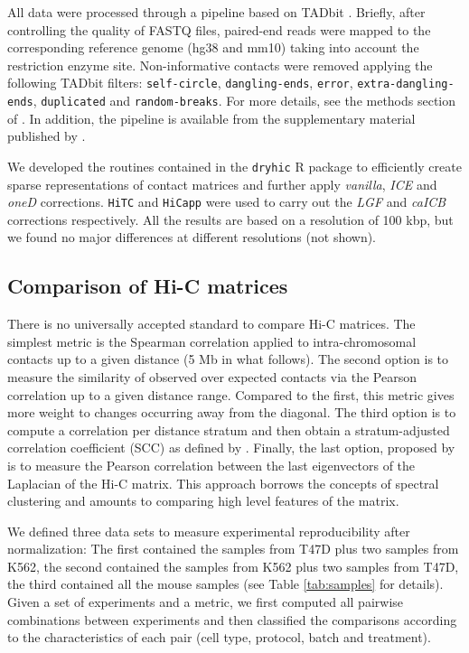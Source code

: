 \documentclass{article}
\begin{document}
All data were processed through a pipeline based on TADbit
\citep{serra2016structural}. Briefly, after controlling the quality of
FASTQ files, paired-end reads were mapped to the corresponding reference
genome (hg38 and mm10) taking into account the restriction enzyme site.
Non-informative contacts were removed applying the following TADbit
filters: \texttt{self-circle}, \texttt{dangling-ends}, \texttt{error},
\texttt{extra-dangling-ends}, \texttt{duplicated} and
\texttt{random-breaks}. For more details, see the methods section of
\cite{stadhouders2017transcription}. In addition, the pipeline is
available from the supplementary material published by
\cite{quilez2017managing}.

We developed the routines contained in the \texttt{dryhic} R package to
efficiently create sparse representations of contact matrices and further
apply \textit{vanilla}, \textit{ICE} and \textit{oneD} corrections.
\texttt{HiTC} \citep{servant2012hitc} and \texttt{HiCapp}
\citep{wu2016computational} were used to carry out the \textit{LGF} and
\textit{caICB} corrections respectively. All the results are based on a
resolution of 100 kbp, but we found no major differences at different
resolutions (not shown).



\subsection{Comparison of Hi-C matrices}
\label{sec:comp}

There is no universally accepted standard to compare Hi-C matrices. The
simplest metric is the Spearman correlation applied to intra-chromosomal
contacts up to a given distance (5 Mb in what follows). The second option
is to measure the similarity of observed over expected contacts via the
Pearson correlation up to a given distance range. Compared to the first,
this metric gives more weight to changes occurring away from the diagonal.
The third option is to compute a correlation per distance stratum and then
obtain a stratum-adjusted correlation coefficient (SCC) as defined by
\cite{yang2017hicrep}. Finally, the last option, proposed by
\cite{yan2017hicspector} is to measure the Pearson correlation between the
last eigenvectors of the Laplacian of the Hi-C matrix. This approach
borrows the concepts of spectral clustering \citep{von2007tutorial} and
amounts to comparing high level features of the matrix.

We defined three data sets to measure experimental reproducibility after
normalization: The first contained the samples from T47D plus two samples
from K562, the second contained the samples from K562 plus two samples
from T47D, the third contained all the mouse samples (see Table
\ref{tab:samples} for details). Given a set of experiments and a metric,
we first computed all pairwise combinations between experiments and then
classified the comparisons according to the characteristics of each pair
(cell type, protocol, batch and treatment).
\end{document}
